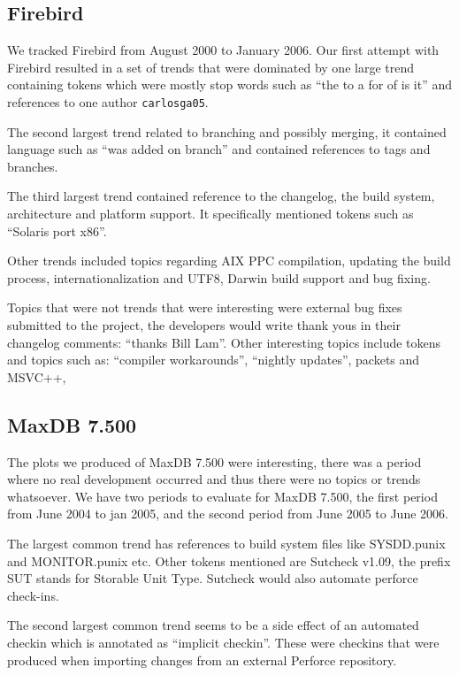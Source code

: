 \documentclass[times, 10pt,twocolumn]{article}
\begin{document}
\subsection{Firebird}


We tracked Firebird from August 2000 to January 2006.
Our first attempt with Firebird resulted in a set of trends that were
dominated by one large trend containing tokens which were mostly stop
words such as ``the to a for of is it'' and references to one author
\texttt{carlosga05}. 

The second largest trend related to branching and possibly merging, it
contained language such as ``was added on branch'' and contained
references to tags and branches.

The third largest trend contained reference to the changelog, the
build system, architecture and platform support. It specifically
mentioned tokens such as ``Solaris port x86''.

Other trends included topics regarding AIX PPC compilation, updating
the build process, internationalization and UTF8, Darwin build support
and bug fixing.

Topics that were not trends that were interesting were external bug
fixes submitted to the project, the developers would write thank yous
in their changelog comments: ``thanks Bill Lam''. Other interesting
topics include tokens and topics such as: ``compiler workarounds'', ``nightly updates'', packets and MSVC++, 

\subsection{MaxDB 7.500}



The plots we produced of MaxDB 7.500 were interesting, there was a
period where no real development occurred and thus there were no topics or trends
whatsoever. We have two periods to evaluate for MaxDB 7.500, the first
period from June 2004 to jan 2005, and the second period from June
2005 to June 2006.

The largest common trend has references to build system files like
SYSDD.punix and MONITOR.punix etc. Other tokens mentioned are Sutcheck
v1.09, the prefix SUT stands for Storable Unit Type. Sutcheck would
also automate perforce check-ins.

The second largest common trend seems to be a side effect of an
automated checkin which is annotated as ``implicit checkin''. These
were checkins that were produced when importing changes from an
external Perforce repository.
\end{document}
